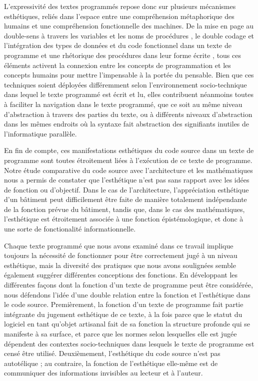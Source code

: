 \documentclass{article}
\begin{document}
L'expressivité des textes programmés repose donc sur plusieurs mécanismes esthétiques, reliés dans l'espace entre une compréhension métaphorique des humains et une compréhension fonctionnelle des machines. De la mise en page au double-sens à travers les variables et les noms de procédures \citep{paloque-berges_poetique_2009}, le double codage et l'intégration des types de données et du code fonctionnel dans un texte de programme \citep{cox_speaking_2013} et une rhétorique des procédures dans leur forme écrite \citep{bogost_rhetoric_2008}, tous ces éléments activent la connexion entre les concepts de programmation et les concepts humains pour mettre l'impensable à la portée du pensable. Bien que ces techniques soient déployées différemment selon l'environnement socio-technique dans lequel le texte programmé est écrit et lu, elles contribuent néanmoins toutes à faciliter la navigation dans le texte programmé, que ce soit au même niveau d'abstraction à travers des parties du texte, ou à différents niveaux d'abstraction dans les mêmes endroits où la syntaxe fait abstraction des signifiants inutiles de l'informatique parallèle.

En fin de compte, ces manifestations esthétiques du code source dans un texte de programme sont toutes étroitement liées à l'exécution de ce texte de programme.  Notre étude comparative du code source avec l'architecture et les mathématiques nous a permis de constater que l'esthétique n'est pas sans rapport avec les idées de fonction ou d'objectif. Dans le cas de l'architecture, l'appréciation esthétique d'un bâtiment peut difficilement être faite de manière totalement indépendante de la fonction prévue du bâtiment, tandis que, dans le cas des mathématiques, l'esthétique est étroitement associée à une fonction épistémologique, et donc à une sorte de fonctionalité informationnelle.

Chaque texte programmé que nous avons examiné dans ce travail implique toujours la nécessité de fonctionner pour être correctement jugé à un niveau esthétique, mais la diversité des pratiques que nous avons soulignées semble également suggérer différentes conceptions des fonctions. En développant les différentes façons dont la fonction d'un texte de programme peut être considérée, nous défendons l'idée d'une double relation entre la fonction et l'esthétique dans le code source. Premièrement, la fonction d'un texte de programme fait partie intégrante du jugement esthétique de ce texte, à la fois parce que le statut du logiciel en tant qu'objet artisanal fait de sa fonction la structure profonde qui se manifeste à sa surface, et parce que les normes selon lesquelles elle est jugée dépendent des contextes socio-techniques dans lesquels le texte de programme est censé être utilisé. Deuxièmement, l'esthétique du code source n'est pas autotélique ; au contraire, la fonction de l'esthétique elle-même est de communiquer des informations invisibles au lecteur et à l'auteur.
\end{document}
